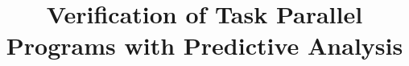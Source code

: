 \documentclass[conference]{IEEEtran}
\begin{document}
\title{Verification of Task Parallel Programs with Predictive Analysis}


\begin{comment}
\author{\IEEEauthorblockN{Radha Nakade}
\IEEEauthorblockA{Department of Computer Science\\
Brigham Young University\\
Provo, Utah\\
Email: radha.nakade@gmail.com}
\and
\IEEEauthorblockN{Eric Mercer}
\IEEEauthorblockA{Department of Computer Science\\
Brigham Young University\\
Provo, Utah\\
Email: egm@cs.byu.edu}
\and
\IEEEauthorblockN{Jay McCarthy}
\IEEEauthorblockA{Department of Computer Science\\
University of Massachusetts Lowell\\
Email: jay.mccarthy@gmail.com}}

\end{comment}
\maketitle

\begin{abstract}

\end{abstract}

\IEEEpeerreviewmaketitle






%



\clearpage


\end{document}
